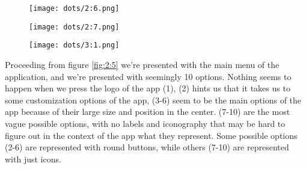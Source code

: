 \begin{figure}
\centering
\captionsetup{format=multiline,font=footnotesize}
\begin{minipage}{.33333\textwidth}
  \centering
  \texttt{[image: dots/2:6.png]}
  \label{fig:2:6}
\end{minipage}%
\begin{minipage}{.33333\textwidth}
  \centering
  \texttt{[image: dots/2:7.png]}
  \label{fig:2:7}
\end{minipage}%
\begin{minipage}{.33333\textwidth}
  \centering
  \texttt{[image: dots/3:1.png]}
  \label{fig:3:1}
\end{minipage}
\end{figure}

Proceeding from figure \ref{fig:2:5} we're presented with the main menu of the application, and we're presented with seemingly 10 options. Nothing seems to happen when we press the logo of the app (1), (2) hints us that it takes us to some customization options of the app, (3-6) seem to be the main options of the app because of their large size and position in the center. (7-10) are the most vague possible options, with no labels and iconography that may be hard to figure out in the context of the app what they represent. Some possible options (2-6) are represented with round buttons, while others (7-10) are represented with just icons.
